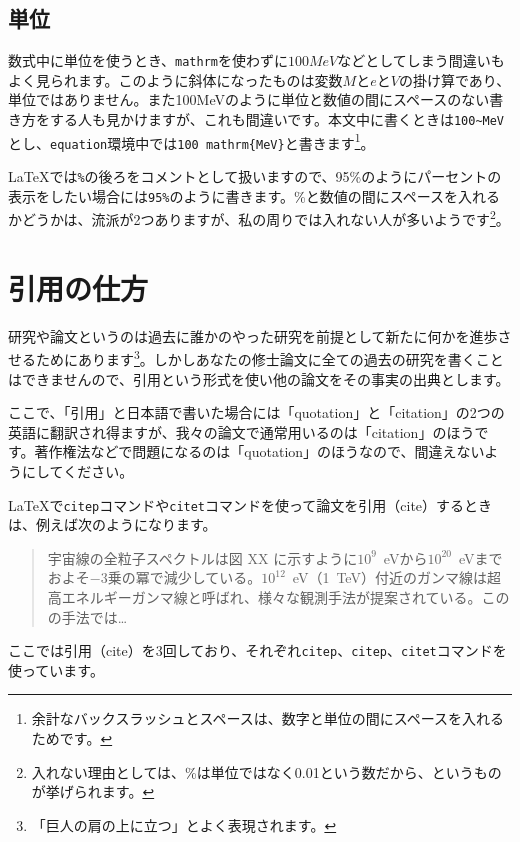 \subsection{単位}
数式中に単位を使うとき、\texttt{\bs{}mathrm}を使わずに$100 MeV$などとしてしまう間違いもよく見られます。このように斜体になったものは変数$M$と$e$と$V$の掛け算であり、単位ではありません。また100MeVのように単位と数値の間にスペースのない書き方をする人も見かけますが、これも間違いです。本文中に書くときは\texttt{100\~{}MeV}とし、\texttt{equation}環境中では\texttt{100\bs{} \bs{}mathrm\{MeV\}}と書きます\footnote{余計なバックスラッシュとスペースは、数字と単位の間にスペースを入れるためです。}。

\LaTeX{}では\texttt{\%}の後ろをコメントとして扱いますので、95\%のようにパーセントの表示をしたい場合には\texttt{95\bs{}\%}のように書きます。\%と数値の間にスペースを入れるかどうかは、流派が2つありますが、私の周りでは入れない人が多いようです\footnote{入れない理由としては、\%は単位ではなく0.01という数だから、というものが挙げられます。}。

\section{引用の仕方}

研究や論文というのは過去に誰かのやった研究を前提として新たに何かを進歩させるためにあります\footnote{「巨人の肩の上に立つ」とよく表現されます。}。しかしあなたの修士論文に全ての過去の研究を書くことはできませんので、引用という形式を使い他の論文をその事実の出典とします。

ここで、「引用」と日本語で書いた場合には「quotation」と「citation」の2つの英語に翻訳され得ますが、我々の論文で通常用いるのは「citation」のほうです。著作権法などで問題になるのは「quotation」のほうなので、間違えないようにしてください。

\LaTeX{}で\texttt{citep}コマンドや\texttt{citet}コマンドを使って論文を引用（cite）するときは、例えば次のようになります。

\begin{quote} %
  宇宙線の全粒子スペクトルは図 XX に示すように$10^9$~eVから$10^{20}$~eVまでおよそ$-3$乗の冪で減少している\citep{Swordy2001}。$10^{12}$~eV（1~TeV）付近のガンマ線は超高エネルギーガンマ線と呼ばれ、様々な観測手法が提案されている\citep[例えば][を見よ]{Okumura2005}。この\citet{Okumura2005}の手法では\ldots
\end{quote}
ここでは引用（cite）を3回しており、それぞれ\texttt{citep}、\texttt{citep}、\texttt{citet}コマンドを使っています。

